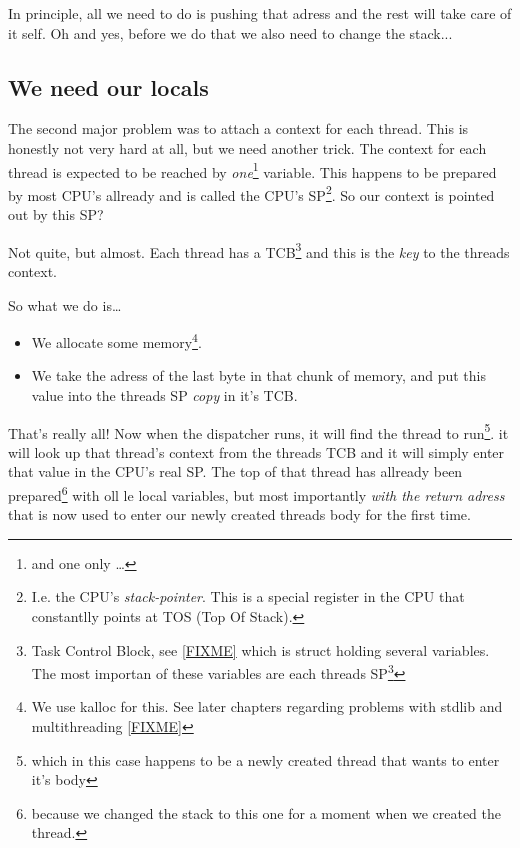 {		In principle, all we need to do is pushing that adress and the rest will take care of it self. Oh and yes, before we do that we also need to change the stack...

	\subsection{We need our locals}
		The second major problem was to attach a context for each thread. This is honestly not very hard at all, but we need another trick. The context for each thread is expected to be reached by \textit{one}\footnote{and one only \ldots} variable. This happens to be prepared by most CPU's allready and is called the CPU's SP\footnote{I.e. the CPU's \textit{stack-pointer}. This is a special register in the CPU that constantlly points at TOS (Top Of Stack).}. So our context is pointed out by this SP?

		Not quite, but almost. Each thread has a TCB\footnote{Task Control Block, see \ref{FIXME} which is struct holding several variables. The most importan of these variables are each threads SP\footnote{Actually, a copy of each threads SP as it were just before it got blocked. The real SP belongs to the CPU and there can only be one\ldots}} and this is the \textit{key} to the threads context.

		So what we do is\ldots 
		\begin{itemize}
			\item We allocate some memory\footnote{We use kalloc for this. See later chapters regarding problems with stdlib and multithreading \ref{FIXME}}.
			\item We take the adress of the last byte in that chunk of memory, and put this value into the threads SP \textit{copy} in it's TCB.
		\end{itemize}
		That's really all! Now when the dispatcher runs, it will find the thread to run\footnote{which in this case happens to be a newly created thread that wants to enter it's body}. it will look up that thread's context from the threads TCB and it will simply enter that value in the CPU's real SP. The top of that thread has allready been prepared\footnote{because we changed the stack to this one for a moment when we created the thread.} with oll le local variables, but most importantly \textit{with the return adress} that is now used to enter our newly created threads body for the first time.

}
